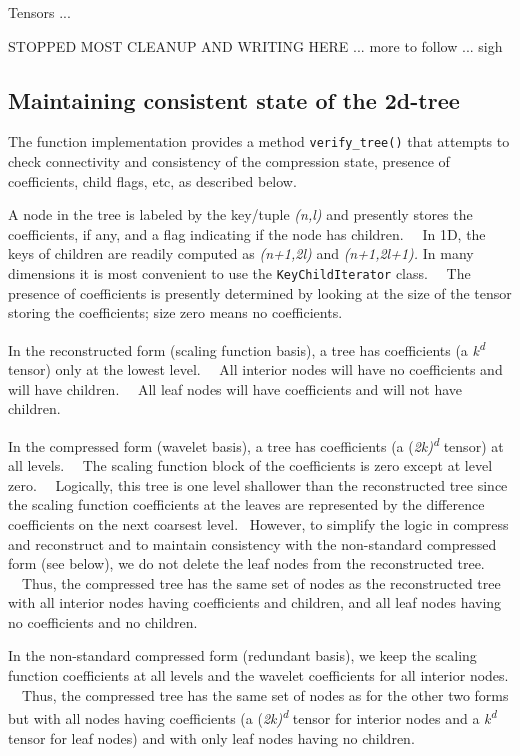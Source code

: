 \documentclass[letterpaper]{article}
\begin{document}
Tensors ...

STOPPED MOST CLEANUP AND WRITING HERE ... more to follow ... sigh

\subsection{Maintaining consistent state of the 2d-tree}
The function implementation provides a method \texttt{verify\_tree()} that attempts to check connectivity and
consistency of the compression state, presence of coefficients, child flags, etc, as described below.

A node in the tree is labeled by the key/tuple \textit{(n,l)} and presently stores the coefficients, if any, and a flag
indicating if the node has children. \ \ In 1D, the keys of children are readily computed as \textit{(n+1,2l)} and
\textit{(n+1,2l+1). }In many dimensions it is most convenient to use the \texttt{KeyChildIterator} class. \ \ The
presence of coefficients is presently determined by looking at the size of the tensor storing the coefficients; size
zero means no coefficients.

In the reconstructed form (scaling function basis), a tree has coefficients (a \textit{k}\textit{\textsuperscript{d}}
tensor) only at the lowest level. \ \ All interior nodes will have no coefficients and will have children. \ \ All leaf
nodes will have coefficients and will not have children.

In the compressed form (wavelet basis), a tree has coefficients (a (\textit{2k)}\textit{\textsuperscript{d}} tensor) at
all levels. \ \ The scaling function block of the coefficients is zero except at level zero. \ \ Logically, this tree
is one level shallower than the reconstructed tree since the scaling function coefficients at the leaves are
represented by the difference coefficients on the next coarsest level. \ However, to simplify the logic in compress and
reconstruct and to maintain consistency with the non-standard compressed form (see below), we do not delete the leaf
nodes from the reconstructed tree. \ \ Thus, the compressed tree has the same set of nodes as the reconstructed tree
with all interior nodes having coefficients and children, and all leaf nodes having no coefficients and no children. \ 

In the non-standard compressed form (redundant basis), we keep the scaling function coefficients at all levels and the
wavelet coefficients for all interior nodes. \ \ Thus, the compressed tree has the same set of nodes as for the other
two forms but with all nodes having coefficients (a (\textit{2k)}\textit{\textsuperscript{d}} tensor for interior nodes
and a \textit{k}\textit{\textsuperscript{d}} tensor for leaf nodes) and with only leaf nodes having no children.
\end{document}

